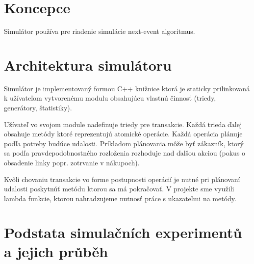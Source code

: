 \documentclass[11pt, a4paper, titlepage]{article}
\begin{document}
\section{Koncepce}
Simulátor používa pre riadenie simulácie next-event algoritmus\cite[str.~39]{opora}.


\section{Architektura simulátoru}
Simulátor je implementovaný formou C++ knižnice ktorá je staticky prilinkovaná k užívateľom vytvorenému modulu obsahujúcu vlastnú činnosť (triedy, generátory, štatistiky).

Užívateľ vo svojom module nadefinuje triedy pre transakcie. Každá trieda ďalej obsahuje metódy ktoré reprezentujú atomické operácie. Každá operácia plánuje podľa potreby budúce udalosti. Príkladom plánovania môže byť zákazník, ktorý sa podľa pravdepodobnostného rozloženia rozhoduje nad ďalšou akciou (pokus o obsadenie linky popr. zotrvanie v nákupoch).

Kvôli chovaniu transakcie vo forme postupnosti operácií je nutné pri plánovaní udalosti poskytnúť metódu ktorou sa má pokračovať. V projekte sme využili lambda funkcie\cite{lambda}, ktorou nahradzujeme nutnosť práce s ukazateľmi na metódy.

%

\section{Podstata simulačních experimentů a jejich průběh}
\end{document}
